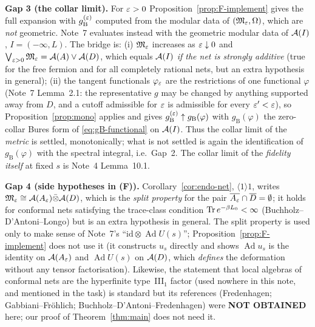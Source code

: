 \documentclass[11pt]{article}
\newcommand{\Om}{\Omega}
\newcommand{\gB}{g_{\mathrm B}}
\newcommand{\Ad}{\operatorname{Ad}}\newcommand{\ket}[1]{|#1\rangle}\newcommand{\bra}[1]{\langle#1|}
\begin{document}
\begin{verdictgap}
\textbf{Gap 3 (the collar limit).}  For $\varepsilon>0$ Proposition~\ref{prop:F-implement} gives the full expansion with
$\gB^{(\eps)}$ computed from the modular data of $(\cM_\eps,\Om)$, which are \emph{not} geometric.  Note~7 evaluates
instead with the geometric modular data of $\mathcal A(I)$, $I=(-\infty,L)$.  The bridge is:
(i) $\mathfrak M_\varepsilon$ increases as $\varepsilon\downarrow0$ and $\bigvee_{\varepsilon>0}\mathfrak M_\varepsilon=\mathcal A(A)\vee\mathcal A(D)$, which equals
$\mathcal A(I)$ \emph{if the net is strongly additive} (true for the free fermion and for all completely rational nets, but
an extra hypothesis in general); (ii) the tangent functionals $\varphi_\varepsilon$ are the restrictions of one functional
$\varphi$ (Note~7 Lemma~2.1: the representative $g$ may be changed by anything supported away from $D$, and a cutoff
admissible for $\varepsilon$ is admissible for every $\varepsilon'<\varepsilon$), so Proposition~\ref{prop:mono} applies and gives
$\gB^{(\eps)}\uparrow\gB(\varphi)$ with $\gB(\varphi)$ the zero-collar Bures form of \eqref{eq:gB-functional}
on $\mathcal A(I)$.  Thus the collar limit of the \emph{metric} is settled, monotonically; what is not settled is again the
identification of $\gB(\varphi)$ with the spectral integral, i.e.\ Gap~2.  The collar limit of the
\emph{fidelity itself} at fixed $s$ is Note~4 Lemma~10.1.
\end{verdictgap}

\begin{verdictgap}
\textbf{Gap 4 (side hypotheses in (F)).}  Corollary~\ref{cor:endo-net}, $\langle1\rangle1$, writes
$\mathfrak M_\varepsilon\cong\mathcal A(A_\varepsilon)\bar\otimes\mathcal A(D)$, which is the \emph{split property} for the pair
$\overline{A_\varepsilon}\cap\overline D=\emptyset$; it holds for conformal nets satisfying the trace-class condition
$\operatorname{Tr} e^{-\beta L_0}<\infty$ (Buchholz--D'Antoni--Longo) but is an extra hypothesis in general.  The split property is
used only to make sense of Note~7's ``$\mathrm{id}\otimes\Ad U(s)$''; Proposition~\ref{prop:F-implement} does not use
it (it constructs $u_s$ directly and shows $\Ad u_s$ is the identity on $\mathcal A(A_\varepsilon)$ and $\Ad U(s)$ on $\mathcal A(D)$,
which \emph{defines} the deformation without any tensor factorisation).  Likewise, the statement that local algebras
of conformal nets are the hyperfinite type~III$_1$ factor (used nowhere in this note, and mentioned in the task) is
standard but its references (Fredenhagen; Gabbiani--Fr\"ohlich; Buchholz--D'Antoni--Fredenhagen) were
\textbf{NOT OBTAINED} here; our proof of Theorem~\ref{thm:main} does not need it.
\end{verdictgap}
\end{document}
